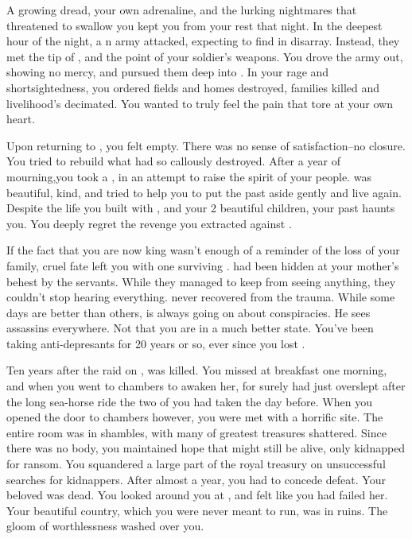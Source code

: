 \documentclass[char]{NeptuneBall}
\begin{document}
A growing dread, your own adrenaline, and the lurking nightmares that threatened to swallow you kept you from your rest that night. In the deepest hour of the night, a \pPacifica{}n army attacked, expecting to find \pAtlantis{} in disarray. Instead, they met the tip of \iTrident{\MYname{}}, and the point of your soldier's weapons. You drove the army out, showing no mercy, and pursued them deep into \pPacifica{}. In your rage and shortsightedness, you ordered fields and homes destroyed, families killed and livelihood's decimated. You wanted \pPacifica{} to truly feel the pain that tore at your own heart.

Upon returning to \pAtlantis{}, you felt empty. There was no sense of satisfaction--no closure. You tried to rebuild what \pPacifica{} had so callously destroyed. After a year of mourning,you took a \cQueen{\spouse{}}, \cQueen{\King{}} \cQueen{} in an attempt to raise the spirit of your people. \cQueen{\They{}} was beautiful, kind, and tried to help you to put the past aside gently and live again. Despite the life you built with \cQueen{}, and your 2 beautiful children, your past haunts you. You deeply regret the revenge you extracted against \pPacifica{}. 

If the fact that you are now king wasn't enough of a reminder of the loss of your family, cruel fate left you with one surviving \cPlant{\sibling}. \cPlant{} had been hidden at your mother's behest by the servants.  While they managed to keep \cPlant{\them} from seeing anything, they couldn't stop \cPlant{\them} hearing everything. \cPlant{} never recovered from the trauma.  While some days are better than others, \cPlant{} is always going on about conspiracies. He sees assassins everywhere.  Not that you are in a much better state. You've been taking anti-depresants for 20 years or so, ever since you lost \cQueen{}. 

Ten years after the raid on \pPacifica{}, \cQueen{} was killed. You missed \cQueen{\them} at breakfast one morning, and when you went to \cQueen{\them} chambers to awaken her, for surely \cQueen{\they} had just overslept after the long sea-horse ride the two of you had taken the day before. When you opened the door to \cQueen{\them} chambers however, you were met with a horrific site. The entire room was in shambles, with many of \cQueen{\them} greatest treasures shattered. Since there was no body, you maintained hope that \cQueen{\they} might still be alive, only kidnapped for ransom. You squandered a large part of the royal treasury on unsuccessful searches for \cQueen{\them{}} kidnappers. After almost a year, you had to concede defeat. Your beloved \cQueen{} was dead. You looked around you at \pAtlantis{}, and felt like you had failed her. Your beautiful country, which you were never meant to run, was in ruins. The gloom of worthlessness washed over you.
\end{document}
